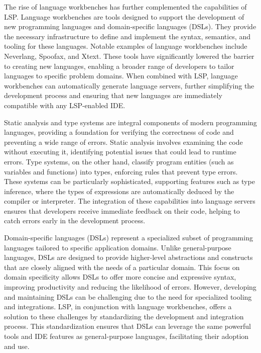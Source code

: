 The rise of language workbenches has further complemented the capabilities of LSP. Language workbenches are tools designed to support the development of new programming languages and domain-specific languages (DSLs). They provide the necessary infrastructure to define and implement the syntax, semantics, and tooling for these languages. Notable examples of language workbenches include Neverlang, Spoofax, and Xtext. These tools have significantly lowered the barrier to creating new languages, enabling a broader range of developers to tailor languages to specific problem domains. When combined with LSP, language workbenches can automatically generate language servers, further simplifying the development process and ensuring that new languages are immediately compatible with any LSP-enabled IDE.

Static analysis and type systems are integral components of modern programming languages, providing a foundation for verifying the correctness of code and preventing a wide range of errors. Static analysis involves examining the code without executing it, identifying potential issues that could lead to runtime errors. Type systems, on the other hand, classify program entities (such as variables and functions) into types, enforcing rules that prevent type errors. These systems can be particularly sophisticated, supporting features such as type inference, where the types of expressions are automatically deduced by the compiler or interpreter. The integration of these capabilities into language servers ensures that developers receive immediate feedback on their code, helping to catch errors early in the development process.

Domain-specific languages (DSLs) represent a specialized subset of programming languages tailored to specific application domains. Unlike general-purpose languages, DSLs are designed to provide higher-level abstractions and constructs that are closely aligned with the needs of a particular domain. This focus on domain specificity allows DSLs to offer more concise and expressive syntax, improving productivity and reducing the likelihood of errors. However, developing and maintaining DSLs can be challenging due to the need for specialized tooling and integrations. LSP, in conjunction with language workbenches, offers a solution to these challenges by standardizing the development and integration process. This standardization ensures that DSLs can leverage the same powerful tools and IDE features as general-purpose languages, facilitating their adoption and use.

